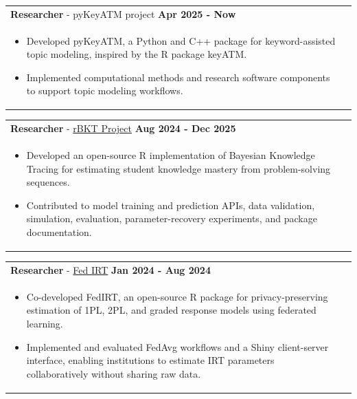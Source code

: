 \documentclass[a4paper,12pt]{article}
\begin{document}
\begin{tabularx}{\linewidth}{ @{}l r@{} }
    \textbf{Researcher} - pyKeyATM project \hfill \textbf{Apr 2025 - Now} \\[4pt]
    \begin{minipage}[t]{\linewidth}
        \begin{itemize}[nosep,after=\strut, leftmargin=1em, itemsep=2pt]
            \item Developed pyKeyATM, a Python and C++ package for keyword-assisted topic modeling, inspired by the R package keyATM.
            \item Implemented computational methods and research software components to support topic modeling workflows.
        \end{itemize}
    \end{minipage}
    \end{tabularx}

\begin{tabularx}{\linewidth}{ @{}l r@{} }
    \textbf{Researcher} - \href{https://github.com/Feng-Ji-Lab/BKT}{rBKT Project} \hfill \textbf{Aug 2024 - Dec 2025} \\[4pt]
    \begin{minipage}[t]{\linewidth}
        \begin{itemize}[nosep,after=\strut, leftmargin=1em, itemsep=2pt]
            \item Developed an open-source R implementation of Bayesian Knowledge Tracing for estimating student knowledge mastery from problem-solving sequences.
            \item Contributed to model training and prediction APIs, data validation, simulation, evaluation, parameter-recovery experiments, and package documentation.
        \end{itemize}
    \end{minipage}
    \end{tabularx}

\begin{tabularx}{\linewidth}{ @{}l r@{} }
    \textbf{Researcher} - \href{https://github.com/Feng-Ji-Lab/fedirt}{Fed IRT} \hfill \textbf{Jan 2024 - Aug 2024} \\[4pt]
    \begin{minipage}[t]{\linewidth}
        \begin{itemize}[nosep,after=\strut, leftmargin=1em, itemsep=2pt]
            \item Co-developed FedIRT, an open-source R package for privacy-preserving estimation of 1PL, 2PL, and graded response models using federated learning.
            \item Implemented and evaluated FedAvg workflows and a Shiny client-server interface, enabling institutions to estimate IRT parameters collaboratively without sharing raw data.
        \end{itemize}
    \end{minipage}
    \end{tabularx}
\end{document}
